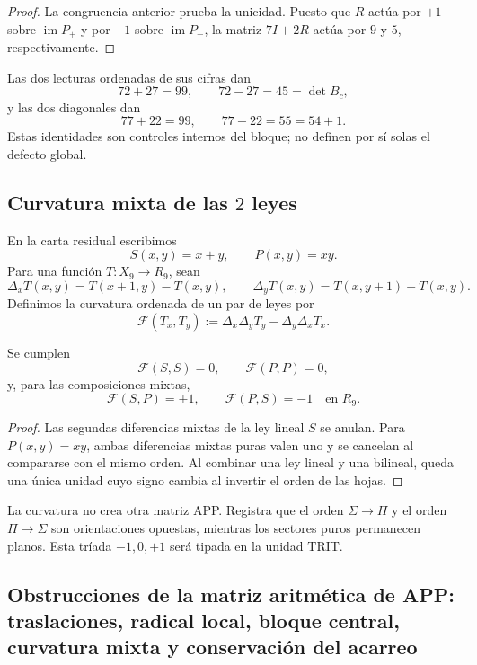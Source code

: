 \begin{proof}
La congruencia anterior prueba la unicidad. Puesto que \(R\) actúa por
\(+1\) sobre \(\operatorname{im}P_+\) y por \(-1\) sobre
\(\operatorname{im}P_-\), la matriz \(7I+2R\) actúa por \(9\) y \(5\),
respectivamente.
\end{proof}

Las dos lecturas ordenadas de sus cifras dan
\[
 72+27=99,
 \qquad
 72-27=45=\det B_c,
\]
y las dos diagonales dan
\[
 77+22=99,
 \qquad
 77-22=55=54+1.
\]
Estas identidades son controles internos del bloque; no definen por sí solas
el defecto global.

\subsection{Curvatura mixta de las \(2\) leyes}

En la carta residual escribimos
\[
 S(x,y)=x+y,
 \qquad
 P(x,y)=xy.
\]
Para una función \(T:X_9\to R_9\), sean
\[
 \Delta_xT(x,y)=T(x+1,y)-T(x,y),
 \qquad
 \Delta_yT(x,y)=T(x,y+1)-T(x,y).
\]
Definimos la curvatura ordenada de un par de leyes por
\[
 \mathcal F(T_x,T_y)
 :=\Delta_x\Delta_yT_y-\Delta_y\Delta_xT_x.
\]

\begin{proposition}
\label{p12-83-c1-s1:prop:app-curvatura-mixta}
Se cumplen
\[
 \mathcal F(S,S)=0,
 \qquad
 \mathcal F(P,P)=0,
\]
y, para las composiciones mixtas,
\[
 \mathcal F(S,P)=+1,
 \qquad
 \mathcal F(P,S)=-1
 \quad\text{en }R_9.
\]
\end{proposition}

\begin{proof}
Las segundas diferencias mixtas de la ley lineal \(S\) se anulan. Para
\(P(x,y)=xy\), ambas diferencias mixtas puras valen uno y se cancelan al
compararse con el mismo orden. Al combinar una ley lineal y una bilineal,
queda una única unidad cuyo signo cambia al invertir el orden de las hojas.
\end{proof}

La curvatura no crea otra matriz APP. Registra que el orden
\(\Sigma\to\Pi\) y el orden \(\Pi\to\Sigma\) son orientaciones opuestas,
mientras los sectores puros permanecen planos. Esta tríada
\(-1,0,+1\) será tipada en la unidad TRIT.

\subsection{Obstrucciones de la matriz aritmética de APP: traslaciones, radical local, bloque central, curvatura mixta y conservación del acarreo}


